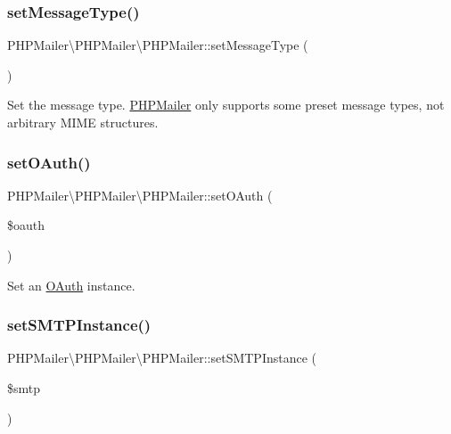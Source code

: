 \subsubsection{\texorpdfstring{set\+Message\+Type()}{setMessageType()}}
{\footnotesize\ttfamily P\+H\+P\+Mailer\textbackslash{}\+P\+H\+P\+Mailer\textbackslash{}\+P\+H\+P\+Mailer\+::set\+Message\+Type (\begin{DoxyParamCaption}{ }\end{DoxyParamCaption})\hspace{0.3cm}{\ttfamily [protected]}}

Set the message type. \hyperlink{classPHPMailer_1_1PHPMailer_1_1PHPMailer}{P\+H\+P\+Mailer} only supports some preset message types, not arbitrary M\+I\+ME structures. \mbox{\label{classPHPMailer_1_1PHPMailer_1_1PHPMailer_a8e5b40dd5a3cece37359640398a0709a}} 
\subsubsection{\texorpdfstring{set\+O\+Auth()}{setOAuth()}}
{\footnotesize\ttfamily P\+H\+P\+Mailer\textbackslash{}\+P\+H\+P\+Mailer\textbackslash{}\+P\+H\+P\+Mailer\+::set\+O\+Auth (\begin{DoxyParamCaption}\item[{\hyperlink{classPHPMailer_1_1PHPMailer_1_1OAuth}{O\+Auth}}]{\$oauth }\end{DoxyParamCaption})}

Set an \hyperlink{classPHPMailer_1_1PHPMailer_1_1OAuth}{O\+Auth} instance. \mbox{\label{classPHPMailer_1_1PHPMailer_1_1PHPMailer_a15b28dbe8be012f10d2f2207f1d2e666}} 
\subsubsection{\texorpdfstring{set\+S\+M\+T\+P\+Instance()}{setSMTPInstance()}}
{\footnotesize\ttfamily P\+H\+P\+Mailer\textbackslash{}\+P\+H\+P\+Mailer\textbackslash{}\+P\+H\+P\+Mailer\+::set\+S\+M\+T\+P\+Instance (\begin{DoxyParamCaption}\item[{\hyperlink{classPHPMailer_1_1PHPMailer_1_1SMTP}{S\+M\+TP}}]{\$smtp }\end{DoxyParamCaption})}

